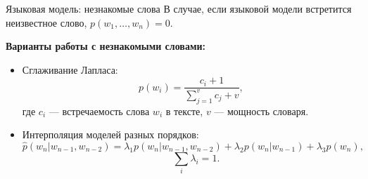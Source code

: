 \begin{frame}{Языковая модель: незнакомые слова}
В случае, если языковой модели встретится неизвестное слово, $p(w_1, \dots, w_n) = 0$.

\textbf{Варианты работы с незнакомыми словами:}
\begin{itemize}
\item Сглаживание Лапласа:
\[
    p(w_i) = \frac{c_i+1}{\sum_{j=1}^v c_j + v}, 
\]
где $c_i$ --- встречаемость слова $w_i$ в тексте, $v$ --- мощность словаря.
\item Интерполяция моделей разных порядков:
\[
    \hat{p}(w_n|w_{n-1},w_{n-2}) = \lambda_1 p(w_n|w_{n-1},w_{n-2}) + \lambda_2 p(w_n|w_{n-1}) + \lambda_3 p(w_n),
\]
\[
     \quad \sum_i \lambda_i = 1.
\]

\end{itemize}
\end{frame}


